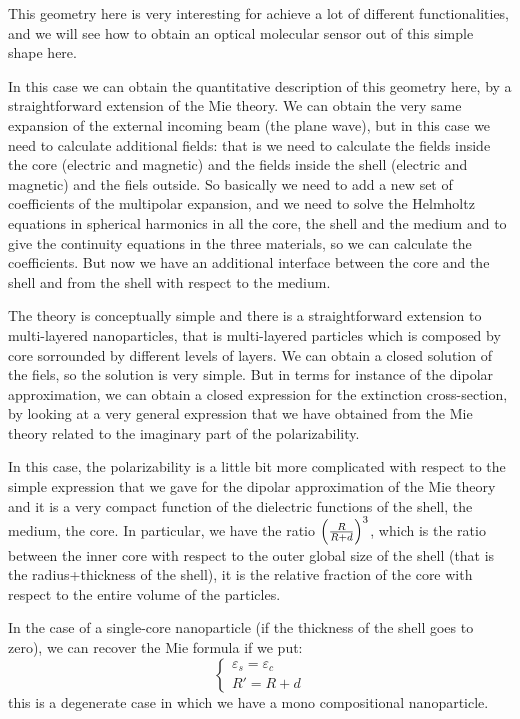 \documentclass[../main/main.tex]{subfiles}
\begin{document}
This geometry here is very interesting for achieve a lot of different functionalities, and we will see how to obtain an optical molecular sensor out of this simple shape here.

In this case we can obtain the quantitative description of this geometry here, by a straightforward extension of the Mie theory.
We can obtain the very same expansion of the external incoming beam (the plane wave), but in this case we need to calculate additional fields: that is we need to calculate the fields inside the core  (electric and magnetic) and the fields inside the shell (electric and magnetic) and the fiels outside.
So basically we need to add a new set of coefficients of the multipolar expansion, and we need to solve the Helmholtz equations in spherical harmonics in all the core, the shell and the medium and to give the continuity equations in the three materials, so we can calculate the coefficients.
But now we have an additional interface between the core and the shell and from the shell with respect to the medium.


The theory is conceptually simple and there is a straightforward extension to multi-layered nanoparticles, that is multi-layered particles which is composed by core sorrounded by different levels of layers. We can obtain a closed solution of the fiels, so the solution is very simple.
But in terms for instance of the dipolar approximation, we can obtain a closed expression for the extinction cross-section, by looking at a very general expression that we have obtained from the Mie theory related to the imaginary part of the polarizability.

In this case, the polarizability is a little bit more complicated with respect to the simple expression that we gave for the dipolar approximation of the Mie theory and it is a very compact function of the dielectric functions of the shell, the medium, the core. In particular, we have the ratio \( \qty(\frac{R}{R+d})^3  \), which is the ratio between the inner core with respect to the outer global size of the shell (that is the radius+thickness of the shell), it is the relative fraction of the core with respect to the entire volume of the particles.

In the case of a single-core nanoparticle (if the thickness of the shell goes to zero), we can recover the Mie formula if we put:
\begin{equation*}
  \begin{cases}
   \varepsilon _s = \varepsilon _c\\
   R' = R+d
  \end{cases}
\end{equation*}
this is a degenerate case in which we have a mono compositional nanoparticle.
\end{document}
